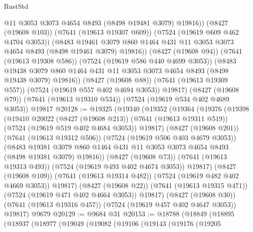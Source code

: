 \begin{lexlean}{RustStd}
\begin{coremodule}
{\begin{coremodule}
{{{{{{{{{{{{{{{{{{{{{{{{{{{{{{{{              @11
              @3053
              @3073
              @4654
              @8493
              (@8498 @19481 @3079)
              @19816))
          (@8427 (@19608 @103))
          (@7641 (@19613 @19307 @609))
          (@7524 (@19619 @609 @462 @4704 @3053))
          (@8483
            @19461
            @3079
            @860
            @1464
            @431
            @11
            @3053
            @3073
            @4654
            @8493
            (@8498 @19461 @3079)
            @19816))
        (@8427 (@19608 @94))
        (@7641 (@19613 @19308 @586))
        (@7524 (@19619 @586 @440 @4699 @3053))
        (@8483
          @19438
          @3079
          @860
          @1464
          @431
          @11
          @3053
          @3073
          @4654
          @8493
          (@8498 @19438 @3079)
          @19816))
      (@8427 (@19608 @88))
      (@7641 (@19613 @19309 @557))
      (@7524 (@19619 @557 @402 @4694 @3053))
      @19817)
    (@8427 (@19608 @79))
    (@7641 (@19613 @19310 @534))
    (@7524 (@19619 @534 @402 @4689 @3053))
    @19817
@20128 := @19325
    (@19340
      (@19352
        (@19364
          (@19376
            (@19398
              (@19410
                @20022
                (@8427 (@19608 @213))
                (@7641 (@19613 @19311 @519))
                (@7524 (@19619 @519 @402 @4684 @3053))
                @19817)
              (@8427 (@19608 @201))
              (@7641 (@19613 @19312 @506))
              (@7524 (@19619 @506 @403 @4679 @3053))
              (@8483
                @19381
                @3079
                @860
                @1464
                @431
                @11
                @3053
                @3073
                @4654
                @8493
                (@8498 @19381 @3079)
                @19816))
            (@8427 (@19608 @73))
            (@7641 (@19613 @19313 @493))
            (@7524 (@19619 @493 @402 @4674 @3053))
            @19817)
          (@8427 (@19608 @109))
          (@7641 (@19613 @19314 @482))
          (@7524 (@19619 @482 @402 @4669 @3053))
          @19817)
        (@8427 (@19608 @22))
        (@7641 (@19613 @19315 @471))
        (@7524 (@19619 @471 @402 @4664 @3053))
        @19817)
      (@8427 (@19608 @30))
      (@7641 (@19613 @19316 @457))
      (@7524 (@19619 @457 @402 @4647 @3053))
      @19817)
    @9679
@20129 := @9684 @31
@20153 := @18788
    (@18849
      (@18895
        (@18937
          (@18977
            (@19049
              (@19082
                (@19106
                  (@19143
                    (@19176
                      (@19205
}}}}}}}}}}}}}}}}}}}}}}}}}}}}}}}}
\end{coremodule}}
\end{coremodule}
\end{lexlean}
